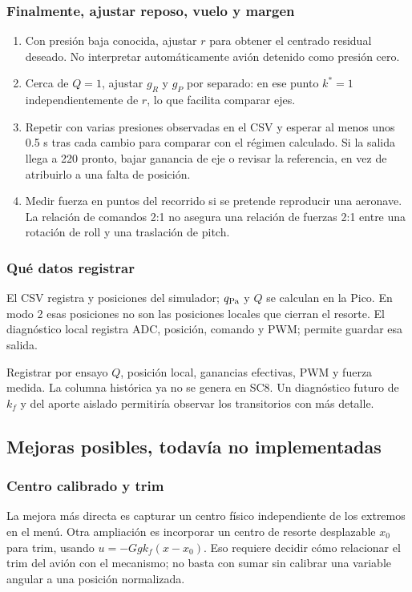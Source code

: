 \subsubsection{Finalmente, ajustar reposo, vuelo y margen}
\begin{enumerate}
\item Con presión baja conocida, ajustar $r$ para obtener el centrado residual deseado. No interpretar automáticamente avión detenido como presión cero.
\item Cerca de $Q=1$, ajustar $g_R$ y $g_P$ por separado: en ese punto $k^*=1$ independientemente de $r$, lo que facilita comparar ejes.
\item Repetir con varias presiones observadas en el CSV y esperar al menos unos 0.5 s tras cada cambio para comparar con el régimen calculado. Si la salida llega a 220 pronto, bajar ganancia de eje o revisar la referencia, en vez de atribuirlo a una falta de posición.
\item Medir fuerza en puntos del recorrido si se pretende reproducir una aeronave. La relación de comandos 2:1 no asegura una relación de fuerzas 2:1 entre una rotación de roll y una traslación de pitch.
\end{enumerate}

\subsubsection{Qué datos registrar}
El CSV registra  y posiciones del simulador; $q_{\rm Pa}$ y $Q$ se calculan en la Pico. En modo 2 esas posiciones no son las posiciones locales que cierran el resorte. El diagnóstico local registra ADC, posición, comando y PWM;  permite guardar esa salida.

Registrar por ensayo $Q$, posición local, ganancias efectivas, PWM y fuerza medida. La columna histórica  ya no se genera en SC8. Un diagnóstico futuro de $k_f$ y del aporte aislado permitiría observar los transitorios con más detalle.

\subsection{Mejoras posibles, todavía no implementadas}
\subsubsection{Centro calibrado y trim}
La mejora más directa es capturar un centro físico independiente de los extremos en el menú. Otra ampliación es incorporar un centro de resorte desplazable $x_0$ para trim, usando $u=-Ggk_f(x-x_0)$. Eso requiere decidir cómo relacionar el trim del avión con el mecanismo; no basta con sumar sin calibrar una variable angular a una posición normalizada.

